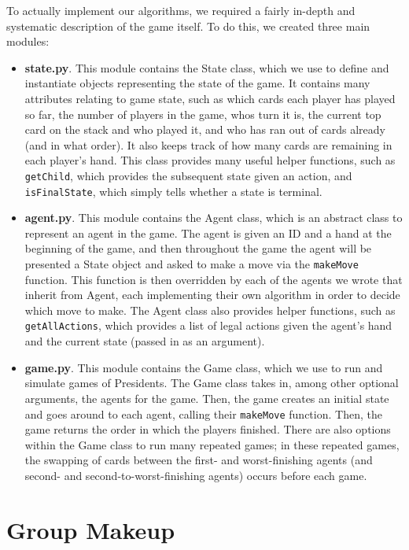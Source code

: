 \documentclass[11pt]{article}
\begin{document}
To actually implement our algorithms, we required a fairly in-depth and systematic description of the game itself. To do this, we created three main modules:
\begin{itemize}
  \item \textbf{state.py}. This module contains the State class, which we use to define and instantiate objects representing the state of the game. It contains many attributes relating to game state, such as which cards each player has played so far, the number of players in the game, whos turn it is, the current top card on the stack and who played it, and who has ran out of cards already (and in what order). It also keeps track of how many cards are remaining in each player's hand. This class provides many useful helper functions, such as \verb|getChild|, which provides the subsequent state given an action, and \verb|isFinalState|, which simply tells whether a state is terminal.
  \item \textbf{agent.py}. This module contains the Agent class, which is an abstract class to represent an agent in the game. The agent is given an ID and a hand at the beginning of the game, and then throughout the game the agent will be presented a State object and asked to make a move via the \verb|makeMove| function. This function is then overridden by each of the agents we wrote that inherit from Agent, each implementing their own algorithm in order to decide which move to make. The Agent class also provides helper functions, such as \verb|getAllActions|, which provides a list of legal actions given the agent's hand and the current state (passed in as an argument).
  \item \textbf{game.py}. This module contains the Game class, which we use to run and simulate games of Presidents. The Game class takes in, among other optional arguments, the agents for the game. Then, the game creates an initial state and goes around to each agent, calling their \verb|makeMove| function. Then, the game returns the order in which the players finished. There are also options within the Game class to run many repeated games; in these repeated games, the swapping of cards between the first- and worst-finishing agents (and second- and second-to-worst-finishing agents) occurs before each game.
\end{itemize}

\section{Group Makeup}
\end{document}
